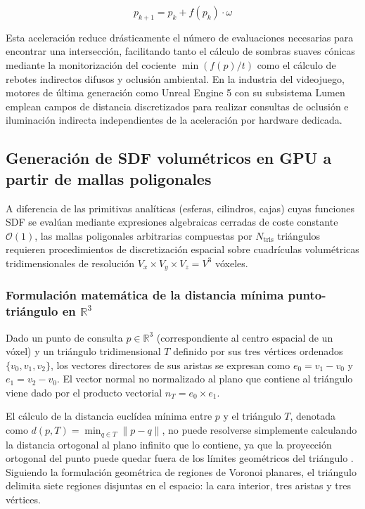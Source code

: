\begin{equation}
  p_{k+1} = p_k + f(p_k) \cdot \omega
\end{equation}

Esta aceleración reduce drásticamente el número de evaluaciones necesarias para encontrar una intersección, facilitando tanto el cálculo de sombras suaves cónicas mediante la monitorización del cociente $\min(f(p)/t)$ como el cálculo de rebotes indirectos difusos y oclusión ambiental. En la industria del videojuego, motores de última generación como Unreal Engine 5 con su subsistema Lumen \cite{wright2022} emplean campos de distancia discretizados para realizar consultas de oclusión e iluminación indirecta independientes de la aceleración por hardware dedicada.

\subsection{Generación de SDF volumétricos en GPU a partir de mallas poligonales}

A diferencia de las primitivas analíticas (esferas, cilindros, cajas) cuyas funciones SDF se evalúan mediante expresiones algebraicas cerradas de coste constante $\mathcal{O}(1)$, las mallas poligonales arbitrarias compuestas por $N_{\text{tris}}$ triángulos requieren procedimientos de discretización espacial sobre cuadrículas volumétricas tridimensionales de resolución $V_x \times V_y \times V_z = V^3$ vóxeles.

\subsubsection{Formulación matemática de la distancia mínima punto-triángulo en \texorpdfstring{$\mathbb{R}^3$}{R3}}

Dado un punto de consulta $p \in \mathbb{R}^3$ (correspondiente al centro espacial de un vóxel) y un triángulo tridimensional $T$ definido por sus tres vértices ordenados $\{v_0, v_1, v_2\}$, los vectores directores de sus aristas se expresan como $e_0 = v_1 - v_0$ y $e_1 = v_2 - v_0$. El vector normal no normalizado al plano que contiene al triángulo viene dado por el producto vectorial $n_T = e_0 \times e_1$.

El cálculo de la distancia euclídea mínima entre $p$ y el triángulo $T$, denotada como $d(p, T) = \min_{q \in T} \|p - q\|$, no puede resolverse simplemente calculando la distancia ortogonal al plano infinito que lo contiene, ya que la proyección ortogonal del punto puede quedar fuera de los límites geométricos del triángulo \cite{ericson2004}. Siguiendo la formulación geométrica de regiones de Voronoi planares, el triángulo delimita siete regiones disjuntas en el espacio: la cara interior, tres aristas y tres vértices.

